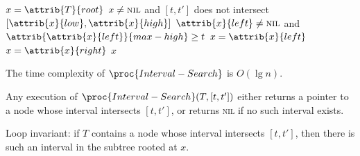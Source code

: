 \begin{codebox}
    \li $x = \attrib{T}{root}$
    \li \While $x \neq \textsc{nil}$ and $[t,t']$ does not intersect $[\attrib{x}{low},\attrib{x}{high}]$ \Do
        \If $\attrib{x}{left} \neq \textsc{nil}$ and $\attrib{\attrib{x}{left}}{max-high} \geq t$ \Then
            \li $x = \attrib{x}{left}$
        \Else
            \li $x = \attrib{x}{right}$
        \End
    \End
    \li \Return $x$
\end{codebox}

The time complexity of $\proc{Interval-Search}$ is $O(\lg n)$.

\begin{theorem}
    Any execution of $\proc{Interval-Search}(T,[t,t'])$ either returns a pointer to a node whose interval intersects $[t,t']$, or returns \textsc{nil} if no such interval exists.
\end{theorem}

\begin{lemma}
    Loop invariant: if $T$ contains a node whose interval intersects $[t,t']$, then there is such an interval in the subtree rooted at $x$.
\end{lemma}

